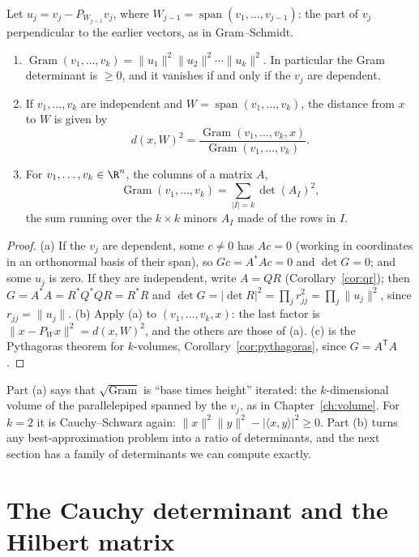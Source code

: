 \begin{theorem}\label{thm:gram}
Let $u_j=v_j-P_{W_{j-1}}v_j$, where $W_{j-1}=\operatorname{span}(v_1,\dots,v_{j-1})$: the part of $v_j$ perpendicular to
the earlier vectors, as in Gram--Schmidt.
\begin{enumerate}[label=(\alph*)]
\item $\operatorname{Gram}(v_1,\dots,v_k)=\|u_1\|^2\|u_2\|^2\cdots\|u_k\|^2$. In particular the Gram determinant is
$\ge0$, and it vanishes if and only if the $v_j$ are dependent.
\item If $v_1,\dots,v_k$ are independent and $W=\operatorname{span}(v_1,\dots,v_k)$, the distance from $x$ to $W$ is given
by
\[
d(x,W)^2=\frac{\operatorname{Gram}(v_1,\dots,v_k,x)}{\operatorname{Gram}(v_1,\dots,v_k)}.
\]
\item For $v_1,\dots,v_k\in\R^n$, the columns of a matrix $A$,
\[
\operatorname{Gram}(v_1,\dots,v_k)=\sum_{|I|=k}\det(A_I)^2,
\]
the sum running over the $k\times k$ minors $A_I$ made of the rows in $I$.
\end{enumerate}
\end{theorem}
\begin{proof}
(a) If the $v_j$ are dependent, some $c\ne0$ has $Ac=0$ (working in coordinates in an orthonormal basis of their span),
so $Gc=A^*Ac=0$ and $\det G=0$; and some $u_j$ is zero. If they are independent, write $A=QR$ (Corollary~\ref{cor:qr});
then $G=A^*A=R^*Q^*QR=R^*R$ and $\det G=|\det R|^2=\prod_jr_{jj}^2=\prod_j\|u_j\|^2$, since $r_{jj}=\|u_j\|$.
(b) Apply (a) to $(v_1,\dots,v_k,x)$: the last factor is $\|x-P_Wx\|^2=d(x,W)^2$, and the others are those of (a).
(c) is the Pythagoras theorem for $k$-volumes, Corollary~\ref{cor:pythagoras}, since $G=A^{\mathsf T}A$.
\end{proof}

Part (a) says that $\sqrt{\operatorname{Gram}}$ is ``base times height'' iterated: the $k$-dimensional volume of the
parallelepiped spanned by the $v_j$, as in Chapter~\ref{ch:volume}. For $k=2$ it is Cauchy--Schwarz again:
$\|x\|^2\|y\|^2-|\langle x,y\rangle|^2\ge0$. Part (b) turns any best-approximation problem into a ratio of determinants,
and the next section has a family of determinants we can compute exactly.

\section{The Cauchy determinant and the Hilbert matrix}

